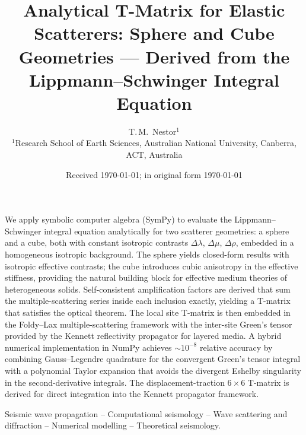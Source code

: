 \documentclass[extra,mreferee]{gji}
\title[T-Matrix for Elastic Scatterers]{%
  Analytical T-Matrix for Elastic Scatterers:
  Sphere and Cube Geometries ---
  Derived from the Lippmann--Schwinger Integral Equation}
\author[T.\,M.\ Nestor]{%
  T.\,M.\ Nestor$^{1}$ \\
  $^{1}$Research School of Earth Sciences,
  Australian National University, Canberra, ACT, Australia
}
\date{Received \today; in original form \today}
\begin{document}
\maketitle

\begin{summary}
We apply symbolic computer algebra (SymPy) to evaluate the
Lippmann--Schwinger integral equation analytically for two scatterer
geometries: a sphere and a cube, both with constant isotropic contrasts
$\Delta\lambda$, $\Delta\mu$, $\Delta\rho$, embedded in a homogeneous
isotropic background.  The sphere yields closed-form results with isotropic
effective contrasts; the cube introduces cubic anisotropy in the effective
stiffness, providing the natural building block for effective medium
theories of heterogeneous solids.  Self-consistent amplification factors
are derived that sum the multiple-scattering series inside each inclusion
exactly, yielding a T-matrix that satisfies the optical theorem.  The local
site T-matrix is then embedded in the Foldy--Lax multiple-scattering
framework with the inter-site Green's tensor provided by the Kennett
reflectivity propagator for layered media.  A hybrid numerical
implementation in NumPy achieves $\sim\!10^{-8}$ relative accuracy by
combining Gauss--Legendre quadrature for the convergent Green's tensor
integral with a polynomial Taylor expansion that avoids the divergent
Eshelby singularity in the second-derivative integrals.  The displacement-traction
$6\times 6$ T-matrix is derived for direct integration into the Kennett
propagator framework.
\end{summary}

\begin{keywords}
  Seismic wave propagation --
  Computational seismology --
  Wave scattering and diffraction --
  Numerical modelling --
  Theoretical seismology.
\end{keywords}









\end{document}
